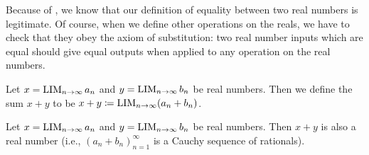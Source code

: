 \begin{note}
  Because of , we know that our definition of equality between two real numbers is legitimate.
  Of course, when we define other operations on the reals, we have to check that they obey the axiom of substitution:
  two real number inputs which are equal should give equal outputs when applied to any operation on the real numbers.
\end{note}

\begin{defn}\label{i:5.3.4}
  Let \(x = \operatorname*{LIM}_{n \to \infty} a_n\) and \(y = \operatorname*{LIM}_{n \to \infty} b_n\) be real numbers.
  Then we define the sum \(x + y\) to be \(x + y \coloneqq \operatorname*{LIM}_{n \to \infty} (a_n + b_n)\).
\end{defn}

\setcounter{thm}{5}
\begin{lem}\label{i:5.3.6}
  Let \(x = \operatorname*{LIM}_{n \to \infty} a_n\) and \(y = \operatorname*{LIM}_{n \to \infty} b_n\) be real numbers.
  Then \(x + y\) is also a real number
  (i.e., \((a_n + b_n)_{n = 1}^{\infty}\) is a Cauchy sequence of rationals).
\end{lem}

